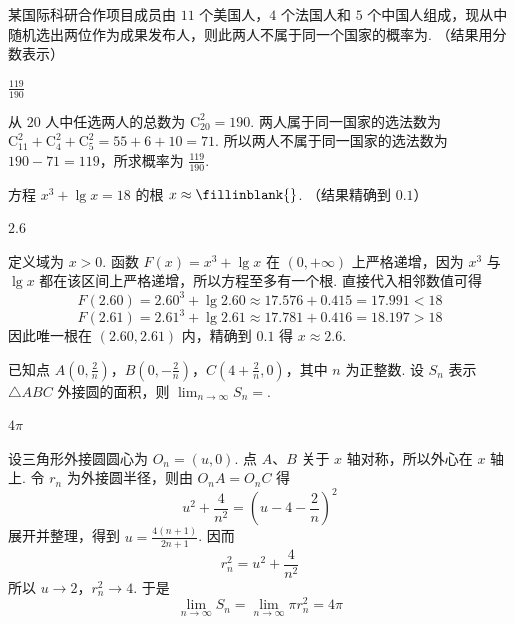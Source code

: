 \begin{problem}
某国际科研合作项目成员由 \(11\) 个美国人，\(4\) 个法国人和 \(5\) 个中国人组成，现从中随机选出两位作为成果发布人，则此两人不属于同一个国家的概率为\fillinblank{}. （结果用分数表示）
\end{problem}

\begin{answer}
\(\frac{119}{190}\)
\end{answer}

\begin{solution}
从 \(20\) 人中任选两人的总数为 \(\mathrm C_{20}^{2}=190\). 两人属于同一国家的选法数为 \(\mathrm C_{11}^{2}+\mathrm C_{4}^{2}+\mathrm C_{5}^{2}=55+6+10=71\). 所以两人不属于同一国家的选法数为 \(190-71=119\)，所求概率为 \(\frac{119}{190}\).
\end{solution}

\begin{problem}
方程 \(x^{3} + \lg x = 18\) 的根 \(x \approx\fillinblank{}\). （结果精确到 \(0.1\)）
\end{problem}

\begin{answer}
\(2.6\)
\end{answer}

\begin{solution}
定义域为 \(x>0\). 函数 \(F(x)=x^{3}+\lg x\) 在 \((0,+\infty)\) 上严格递增，因为 \(x^{3}\) 与 \(\lg x\) 都在该区间上严格递增，所以方程至多有一个根. 直接代入相邻数值可得
\[
F(2.60)=2.60^{3}+\lg2.60\approx17.576+0.415=17.991<18
\]
\[
F(2.61)=2.61^{3}+\lg2.61\approx17.781+0.416=18.197>18
\]
因此唯一根在 \((2.60,2.61)\) 内，精确到 \(0.1\) 得 \(x\approx2.6\).
\end{solution}

\begin{problem}
已知点 \(A\left(0, \frac{2}{n}\right)\)，\(B\left(0, -\frac{2}{n}\right)\)，\(C\left(4 + \frac{2}{n}, 0\right)\)，其中 \(n\) 为正整数. 设 \(S_{n}\) 表示 \(\triangle ABC\) 外接圆的面积，则 \(\displaystyle\lim_{n \to \infty} S_{n} = \)\fillinblank{}.
\end{problem}

\begin{answer}
\(4\pi\)
\end{answer}

\begin{solution}
设三角形外接圆圆心为 \(O_n=(u,0)\). 点 \(A\)、\(B\) 关于 \(x\) 轴对称，所以外心在 \(x\) 轴上. 令 \(r_n\) 为外接圆半径，则由 \(O_nA=O_nC\) 得
\[
u^{2}+\frac{4}{n^{2}}=\left(u-4-\frac{2}{n}\right)^{2}
\]
展开并整理，得到 \(u=\frac{4(n+1)}{2n+1}\). 因而
\[
r_n^{2}=u^{2}+\frac{4}{n^{2}}
\]
所以 \(u\to2\)，\(r_n^{2}\to4\). 于是
\[
\lim_{n\to\infty}S_n=\lim_{n\to\infty}\pi r_n^{2}=4\pi
\]
\end{solution}

